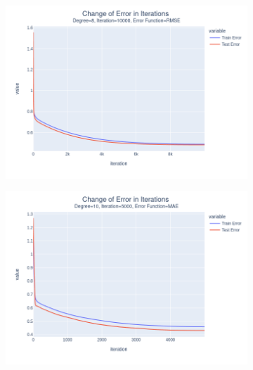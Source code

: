 \documentclass[14pt,a4]{article}
\begin{document}
\begin{figure}[h]
\begin{subfigure}{0.3\linewidth}
        \includegraphics[width=\textwidth]{images/implementation/q1/part_d/error/8_10000_RMSE.png}
    \end{subfigure}
    \newline
    \begin{subfigure}{0.3\linewidth}
        \centering
        \includegraphics[width=\textwidth]{images/implementation/q1/part_d/error/10_5000_MAE.png}
    \end{subfigure}
    \hfill
    \begin{subfigure}{0.3\textwidth}
        \centering

\end{subfigure}
\end{figure}
\end{document}
